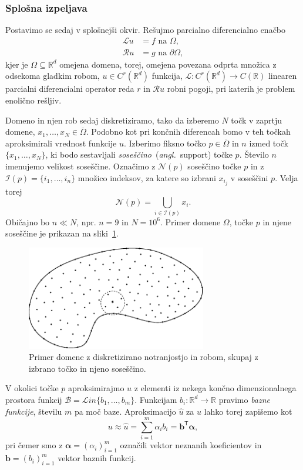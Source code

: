 \documentclass[12pt,a4paper,twoside]{article}
\theoremstyle{definition} %
\theoremstyle{plain} %
\numberwithin{equation}{section}
\newcommand{\R}{\mathbb R}
\newcommand{\Rc}{\mathcal{R}}
\newcommand{\Nc}{\mathcal{N}}
\newcommand{\I}{\mathcal{I}}
\newcommand{\B}{\mathcal{B}}
\renewcommand{\L}{\mathcal{L}}
\newcommand{\T}{\mathsf{T}}
\renewcommand{\b}{\boldsymbol}
\newcommand{\zomega}{\overline{\Omega}}
\newcommand{\Lin}{\mathcal{L}in}
\newcommand{\uh}{\hat{u}}
\newcommand{\ang}[1]{(\textit{angl.}\ #1)}
\begin{document}
\subsubsection{Splošna izpeljava}
\label{sec:splosna-izpeljava}
Postavimo se sedaj v splošnejši okvir.
Rešujmo parcialno diferencialno enačbo
\begin{align}
  \L u &= f \text{ na } \Omega, \label{eq:general-problem} \\
  \Rc u &= g \text{ na } \partial \Omega \nonumber,
\end{align}
kjer je $\Omega \subseteq \R^d$ omejena domena, torej, omejena povezana odprta
množica z odsekoma gladkim robom, $u \in C^r(\R^d)$ funkcija,
$\L\colon C^r(\R^d) \to C(\R)$ linearen
parcialni diferencialni operator reda $r$ in $\Rc u$ robni pogoji,
pri katerih je problem enolično rešljiv.

Domeno in njen rob sedaj diskretiziramo, tako da izberemo $N$ točk v zaprtju
domene, $x_1, \dots, x_N \in \zomega$. Podobno kot pri končnih
diferencah bomo v teh točkah aproksimirali vrednost funkcije $u$.
Izberimo fiksno točko $p \in \zomega$ in $n$ izmed točk $\{x_1, \dots, x_N\}$,
ki bodo sestavljali \emph{soseščino}~\ang{support} točke $p$. Število $n$ imenujemo
velikost soseščine. Označimo z $\Nc(p)$ soseščino točke $p$ in
z $\I(p) = \{i_1, \dots, i_n\}$ množico indeksov, za katere so izbrani
$x_{i_j}$ v soseščini $p$. Velja torej \[
  \Nc(p) = \bigcup_{i \in \I(p)} x_i.
\]
Običajno bo $n \ll N$, npr. $n = 9$ in $N = 10^6$.
Primer domene $\Omega$, točke $p$ in njene soseščine je prikazan na
sliki~\ref{fig:domain-example}.

\begin{figure}[ht]
  \centering
  \includegraphics[width=0.7\textwidth]{images/domain_theoretical.pdf}
  \caption{Primer domene z diskretizirano notranjostjo in robom, skupaj z izbrano
  točko in njeno soseščino.}
  \label{fig:domain-example}
\end{figure}

V okolici točke $p$ aproksimirajmo $u$ z elementi iz nekega končno
dimenzionalnega prostora funkcij $\B = \Lin\{b_1, \dots, b_m\}$.
Funkcijam $b_i\colon \R^d \to \R$ pravimo \emph{bazne funkcije},
številu $m$ pa moč baze. Aproksimacijo $\uh$ za $u$ lahko torej zapišemo kot
\[
  u \approx \uh = \sum_{i=1}^m \alpha_i b_i = \b{b}^\T \b{\alpha},
\]
pri čemer smo z $\b{\alpha} = (\alpha_i)_{i=1}^m$ označili vektor neznanih
koeficientov in $\b{b} = (b_i)_{i=1}^m$ vektor baznih funkcij.
\end{document}
